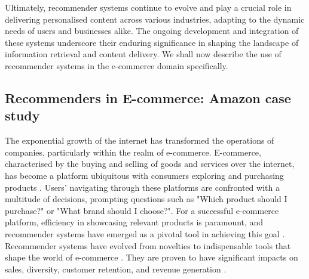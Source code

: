   Ultimately, recommender systems continue to evolve and play a crucial role in delivering personalised content across various industries, adapting to the dynamic needs of users and businesses alike. The ongoing development and integration of these systems underscore their enduring significance in shaping the landscape of information retrieval and content delivery. We shall now describe the use of recommender systems in the e-commerce domain specifically.

\subsection{Recommenders in E-commerce: Amazon case study}
\label{subsec:2 Recommenders in E-commerce: Amazon case study}

The exponential growth of the internet has transformed the operations of companies, particularly within the realm of e-commerce. E-commerce, characterised by the buying and selling of goods and services over the internet, has become a platform ubiquitous with consumers exploring and purchasing products \cite{schafer2001commerce}. Users’ navigating through these platforms are confronted with a multitude of decisions, prompting questions such as "Which product should I purchase?" or "What brand should I choose?". For a successful e-commerce platform, efficiency in showcasing relevant products is paramount, and recommender systems have emerged as a pivotal tool in achieving this goal \cite{schafer1999recommender}. Recommender systems have evolved from novelties to indispensable tools that shape the world of e-commerce \cite{schafer1999recommender}. They are proven to have significant impacts on sales, diversity, customer retention, and revenue generation \cite{linden2003amazon}.

